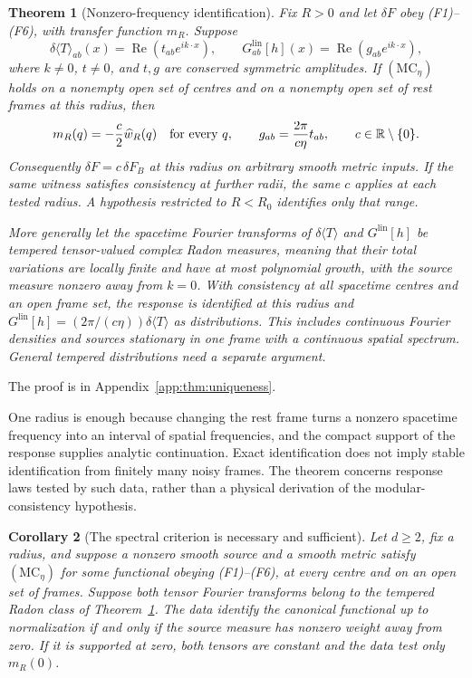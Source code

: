 \documentclass[12pt]{article}
\newtheorem{theorem}{Theorem}[section]
\newtheorem{corollary}[theorem]{Corollary}
\theoremstyle{definition}
\theoremstyle{remark}
\newcommand{\Glin}{G^{\mathrm{lin}}}
\newcommand{\dT}{\delta\langle T\rangle}
\begin{document}
\begin{theorem}[Nonzero-frequency identification]\label{thm:uniqueness}
Fix \(R>0\) and let \(\delta F\) obey (F1)--(F6), with transfer function \(m_R\).
Suppose
\[
\dT_{ab}(x)=\operatorname{Re}(t_{ab}e^{ik\cdot x}),\qquad
\Glin_{ab}[h](x)=\operatorname{Re}(g_{ab}e^{ik\cdot x}),
\]
where \(k\ne0\), \(t\ne0\), and \(t,g\) are conserved symmetric amplitudes.
If \((\mathrm{MC}_\eta)\) holds on a nonempty open set of centres and on a nonempty open set of rest
frames at this radius, then
\[
m_R(q)=-\frac c2\widehat w_R(q)\quad\hbox{for every }q,\qquad
g_{ab}=\frac{2\pi}{c\eta}t_{ab},\qquad c\in\mathbb R\setminus\{0\}.
\]
Consequently \(\delta F=c\,\delta F_B\) at this radius on arbitrary smooth metric inputs.
If the same witness satisfies consistency at further radii, the same \(c\) applies
at each tested radius. A hypothesis restricted to \(R<R_0\) identifies only that range.

More generally let the spacetime Fourier transforms of \(\dT\) and \(\Glin[h]\) be
tempered tensor-valued complex Radon measures, meaning that their total variations
are locally finite and have at most polynomial growth, with the source measure nonzero away
from \(k=0\). With consistency at all spacetime centres and an open frame set,
the response is identified at
this radius and \(\Glin[h]=(2\pi/(c\eta))\dT\) as distributions.
This includes continuous Fourier densities and sources stationary in one frame with
a continuous spatial spectrum. General tempered distributions need a separate argument.
\end{theorem}

The proof is in Appendix~\ref{app:thm:uniqueness}.


One radius is enough because changing the rest frame turns a nonzero spacetime
frequency into an interval of spatial frequencies, and the compact support of the
response supplies analytic continuation. Exact identification does not imply stable
identification from finitely many noisy frames. The theorem concerns response laws tested
by such data, rather than a physical derivation of the modular-consistency hypothesis.

\begin{corollary}[The spectral criterion is necessary and sufficient]\label{cor:spectraliff}
Let \(d\ge2\), fix a radius, and suppose a nonzero smooth source and a smooth metric
satisfy \((\mathrm{MC}_\eta)\) for some functional obeying (F1)--(F6), at every centre
and on an open set of frames. Suppose both tensor Fourier transforms belong to the
tempered Radon class of Theorem~\ref{thm:uniqueness}. The data identify the canonical
functional up to normalization if and only if the source measure has nonzero weight
away from zero. If it is supported at zero, both tensors are constant and the data
test only \(m_R(0)\).
\end{corollary}
\end{document}
